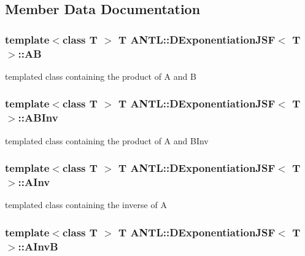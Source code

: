 \subsection{Member Data Documentation}
\hypertarget{classANTL_1_1DExponentiationJSF_a76d1d64d21b9353c39f03febbdede159}{
\subsubsection[{A\-B}]{\setlength{\rightskip}{0pt plus 5cm}template$<$class T $>$ T {\bf A\-N\-T\-L\-::\-D\-Exponentiation\-J\-S\-F}$<$ T $>$\-::A\-B\hspace{0.3cm}{\ttfamily [protected]}}}\label{classANTL_1_1DExponentiationJSF_a76d1d64d21b9353c39f03febbdede159}
templated class containing the product of A and B \hypertarget{classANTL_1_1DExponentiationJSF_adf4d906e0790f0fa2090ff64dd43a0ca}{
\subsubsection[{A\-B\-Inv}]{\setlength{\rightskip}{0pt plus 5cm}template$<$class T $>$ T {\bf A\-N\-T\-L\-::\-D\-Exponentiation\-J\-S\-F}$<$ T $>$\-::A\-B\-Inv\hspace{0.3cm}{\ttfamily [protected]}}}\label{classANTL_1_1DExponentiationJSF_adf4d906e0790f0fa2090ff64dd43a0ca}
templated class containing the product of A and B\-Inv \hypertarget{classANTL_1_1DExponentiationJSF_a74e6f753c656dd8ca7b113597dcb405f}{
\subsubsection[{A\-Inv}]{\setlength{\rightskip}{0pt plus 5cm}template$<$class T $>$ T {\bf A\-N\-T\-L\-::\-D\-Exponentiation\-J\-S\-F}$<$ T $>$\-::A\-Inv\hspace{0.3cm}{\ttfamily [protected]}}}\label{classANTL_1_1DExponentiationJSF_a74e6f753c656dd8ca7b113597dcb405f}
templated class containing the inverse of A \hypertarget{classANTL_1_1DExponentiationJSF_a9056653402c022e724fe79243ee714a2}{
\subsubsection[{A\-Inv\-B}]{\setlength{\rightskip}{0pt plus 5cm}template$<$class T $>$ T {\bf A\-N\-T\-L\-::\-D\-Exponentiation\-J\-S\-F}$<$ T $>$\-::A\-Inv\-B\hspace{0.3cm}{\ttfamily [protected]}}}\label{classANTL_1_1DExponentiationJSF_a9056653402c022e724fe79243ee714a2}
